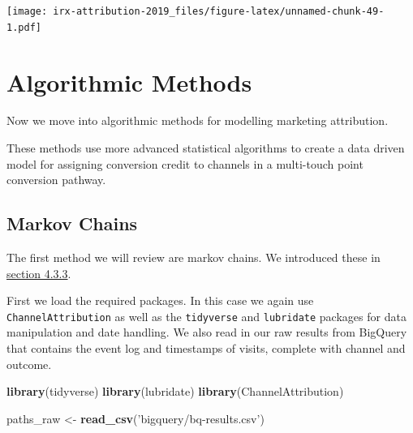 \documentclass[]{book}
\newenvironment{Shaded}{\begin{snugshade}}{\end{snugshade}}
\newcommand{\KeywordTok}[1]{\textcolor[rgb]{0.13,0.29,0.53}{\textbf{#1}}}
\newcommand{\NormalTok}[1]{#1}
\newcommand{\StringTok}[1]{\textcolor[rgb]{0.31,0.60,0.02}{#1}}
\begin{document}
\texttt{[image: irx-attribution-2019\_files/figure-latex/unnamed-chunk-49-1.pdf]}

\hypertarget{algorithmic-methods}{%
\chapter{Algorithmic Methods}\label{algorithmic-methods}}

Now we move into algorithmic methods for modelling marketing attribution.

These methods use more advanced statistical algorithms to create a data driven
model for assigning conversion credit to channels in a multi-touch point
conversion pathway.

\hypertarget{markov-chains}{%
\section{Markov Chains}\label{markov-chains}}

The first method we will review are markov chains. We introduced these in
\protect\hyperlink{markov-methods}{section 4.3.3}.

First we load the required packages. In this case we again use \texttt{ChannelAttribution}
as well as the \texttt{tidyverse} and \texttt{lubridate} packages for data manipulation and
date handling. We also read in our raw results from BigQuery that contains the event log and
timestamps of visits, complete with channel and outcome.

\begin{Shaded}
\begin{Highlighting}[]
\KeywordTok{library}\NormalTok{(tidyverse)}
\KeywordTok{library}\NormalTok{(lubridate)}
\KeywordTok{library}\NormalTok{(ChannelAttribution)}

\NormalTok{paths_raw <-}\StringTok{ }\KeywordTok{read_csv}\NormalTok{(}\StringTok{'bigquery/bq-results.csv'}\NormalTok{)}
\end{Highlighting}
\end{Shaded}
\end{document}

